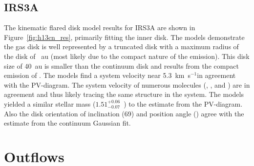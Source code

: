 \subsection{IRS3A}
The \pdspy\space kinematic flared disk model results for IRS3A are shown in Figure~\ref{fig:h13cn_res}, primarily fitting the inner disk. The models demonstrate the gas disk is well represented by a truncated disk with a maximum radius of the disk of ~au (most likely due to the compact nature of the emission). This disk size of 40~au is smaller than the continuum disk and results from the compact emission of \htcn. The models find a system velocity near 5.3~km~s$^{-1}$\space in agreement with the PV-diagram. The system velocity of numerous molecules (\htcop, \cso, and \htcn) are in agreement and thus likely tracing the same structure in the system. The models yielded a similar stellar mass ($1.51^{+0.06}_{-0.07}$~\solm) to the estimate from the PV-diagram. Also the disk orientation of inclination (69\deg) and position angle (\deg) agree with the estimate from the continuum Gaussian fit.



\section{Outflows}\label{sec:outflow}

